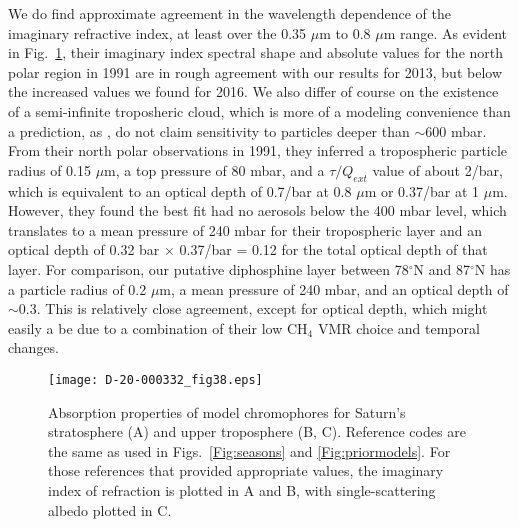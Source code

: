 \documentclass[article,11pt]{emulateapj}
\def\degx{$^\circ$}
\def\mum{$\mu$m }
\def\mumx{$\mu$m}
\def\chf{CH$_4$ }
\begin{document}
We do find approximate agreement in the wavelength dependence of the
imaginary refractive index, at least over the 0.35 \mum to 0.8 \mum
range.  As evident in Fig.\ \ref{Fig:priorchrom}, their imaginary
index spectral shape and absolute values for the north polar region in
1991 are in rough agreement with our results for 2013, but below the
increased values we found for 2016. We also differ of course on the
existence of a semi-infinite troposheric cloud, which is more of a
modeling convenience than a prediction, as \cite{Kark2005}, do not
claim sensitivity to particles deeper than $\sim$600 mbar.  From their
north polar observations in 1991, they inferred a tropospheric
particle radius of 0.15 \mumx, a top pressure of 80 mbar, and a
$\tau/Q_{ext}$ value of about 2/bar, which is equivalent to an optical
depth of 0.7/bar at 0.8 \mum or 0.37/bar at 1 \mumx.  However, they
found the best fit had no aerosols below the 400 mbar level, which
translates to a mean pressure of 240 mbar for their tropospheric layer
and an optical depth of 0.32 bar $\times$ 0.37/bar = 0.12 for the
total optical depth of that layer.  For comparison, our putative
diphosphine layer between 78\degx N and 87\degx N has a particle
radius of 0.2 \mumx, a mean pressure of 240 mbar, and an optical depth
of $\sim$0.3. This is relatively close agreement, except for optical
depth, which might easily a be due to a combination of their low \chf
VMR choice and temporal changes.

    
\begin{figure}[!hbt]\centering
\texttt{[image: D-20-000332\_fig38.eps]}
\caption{Absorption properties of model chromophores for Saturn's
  stratosphere (A) and upper troposphere (B, C). Reference codes are
  the same as used in Figs.\ \ref{Fig:seasons} and
  \ref{Fig:priormodels}.  For those references that provided appropriate values,
  the imaginary index of refraction is plotted in A and B, with
  single-scattering albedo plotted in C.}\label{Fig:priorchrom}
\end{figure}
\end{document}
